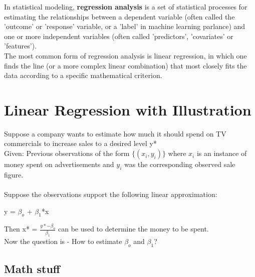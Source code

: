 \documentclass[12pt]{article}
\begin{document}
	\MakeScribeTop


\noindent In statistical modeling, \textbf{regression analysis} is a set of statistical processes for estimating the relationships between a dependent variable (often called the 'outcome' or 'response' variable, or a 'label' in machine learning parlance) and one or more independent variables (often called 'predictors', 'covariates' or 'features'). \\
The most common form of regression analysis is linear regression, in which one finds the line (or a more complex linear combination) that most closely fits the data according to a specific mathematical criterion.

\section{Linear Regression with Illustration}

Suppose a company wants to estimate how much it should spend on TV commercials to increase sales to a desired level y*\\
Given: Previous observations of the form $\{(x_i, y_i)\}$ where $x_i$ is an instance of money spent on advertisements and $y_i$ was the corresponding observed sale figure.\\
\\
Suppose the observations support the following linear approximation:
\begin{center}
    y = $\beta_o$ + $\beta_1$*x
\end{center}
Then x* = $\frac{y*-\beta_o}{\beta_1}$ can be used to determine the money to be spent.\\
Now the question is - How to estimate $\beta_o$ and $\beta_1$?

\subsection{Math stuff}
\end{document}

